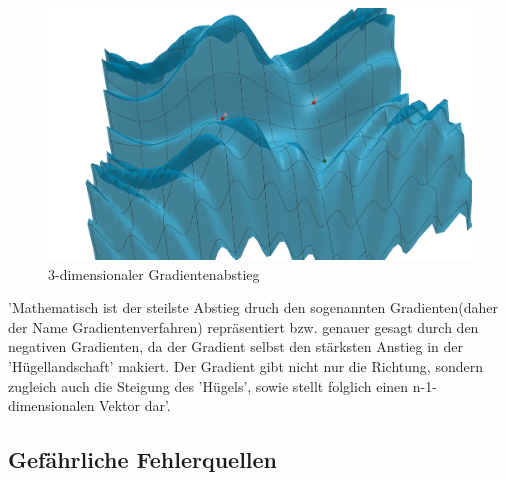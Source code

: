 \begin{figure}[ht]
    \begin{minipage}{0.45\textwidth}
        \centering
        \includegraphics[width=\textwidth]{Sources/03-3.2.3_geogebra.png}
        \caption{3-dimensionaler Gradientenabstieg}
        \label{subsec:3-dimensionaler Gradientenabstieg}
    \end{minipage}
\end{figure}
 'Mathematisch ist der steilste Abstieg druch den sogenannten Gradienten(daher der Name Gradientenverfahren) repräsentiert bzw. genauer gesagt durch den negativen Gradienten, da der 
  Gradient selbst den stärksten Anstieg in der 'Hügellandschaft' makiert. Der Gradient gibt nicht nur die Richtung, sondern zugleich auch die Steigung des 'Hügels', sowie stellt folglich
  einen n-1-dimensionalen Vektor dar'\cite{GR10}.
\fi
\subsection{Gefährliche Fehlerquellen}\label{subsec:gradientenverfahren:fehlerquellen}
